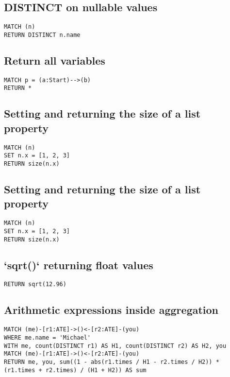 \subsection{DISTINCT on nullable values}

\begin{lstlisting}
MATCH (n)
RETURN DISTINCT n.name
\end{lstlisting}

\subsection{Return all variables}

\begin{lstlisting}
MATCH p = (a:Start)-->(b)
RETURN *
\end{lstlisting}

\subsection{Setting and returning the size of a list property}

\begin{lstlisting}
MATCH (n)
SET n.x = [1, 2, 3]
RETURN size(n.x)
\end{lstlisting}

\subsection{Setting and returning the size of a list property}

\begin{lstlisting}
MATCH (n)
SET n.x = [1, 2, 3]
RETURN size(n.x)
\end{lstlisting}

\subsection{`sqrt()` returning float values}

\begin{lstlisting}
RETURN sqrt(12.96)
\end{lstlisting}

\subsection{Arithmetic expressions inside aggregation}

\begin{lstlisting}
MATCH (me)-[r1:ATE]->()<-[r2:ATE]-(you)
WHERE me.name = 'Michael'
WITH me, count(DISTINCT r1) AS H1, count(DISTINCT r2) AS H2, you
MATCH (me)-[r1:ATE]->()<-[r2:ATE]-(you)
RETURN me, you, sum((1 - abs(r1.times / H1 - r2.times / H2)) * (r1.times + r2.times) / (H1 + H2)) AS sum
\end{lstlisting}

